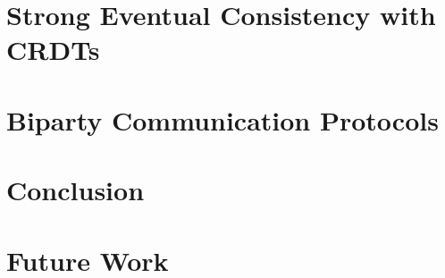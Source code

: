 \section{Strong Eventual Consistency with CRDTs}
\label{crdt}


\section{Biparty Communication Protocols}
\label{biparty}


\section{Conclusion}
\label{conclusion}


\section{Future Work}
\label{futurework}

\appendix


\clearpage





